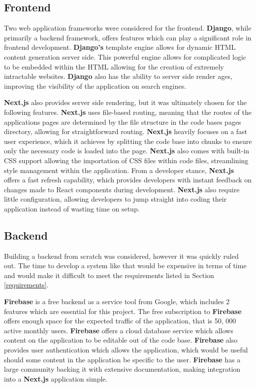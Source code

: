 \documentclass{l4proj}
\begin{document}
\subsection{Frontend}
Two web application frameworks were considered for the frontend. \textbf{Django},  while primarily a backend framework,  offers features which can play a significant role in frontend development. \textbf{Django's} template engine allows for dynamic HTML content generation server side. This powerful engine allows for complicated logic to be embedded within the HTML allowing for the creation of extremely intractable websites. \textbf{Django} also has the ability to server side render ages,  improving the visibility of the application on search engines.

\textbf{Next.js} also provides server side rendering,  but it was ultimately chosen for the following features. \textbf{Next.js} uses file-based routing,  meaning that the routes of the applications pages are determined by the file structure in the code bases pages directory,  allowing for straightforward routing. \textbf{Next.js} heavily focuses on a fast user experience,  which it achieves by splitting the code base into chunks to ensure only the necessary code is loaded into the page. \textbf{Next.js} also comes with built-in CSS support allowing the importation of CSS files within code files,  streamlining style management within the application. From a developer stance,  \textbf{Next.js} offers a fast refresh capability,  which provides developers with instant feedback on changes made to React components during development. \textbf{Next.js} also require little configuration,  allowing developers to jump straight into coding their application instead of wasting time on setup.

\subsection{Backend}
Building a backend from scratch was considered,  however it was quickly ruled out. The time to develop a system like that would be expensive in terms of time and would make it difficult to meet the requirements listed in Section \ref{requirements}.

\textbf{Firebase} is a free backend as a service tool from Google,  which includes 2 features which are essential for this project. The free subscription to \textbf{Firebase} offers enough space for the expected traffic of the application,  that is 50, 000 active monthly users. \textbf{Firebase} offers a cloud database service which allows content on the application to be editable out of the code base. \textbf{Firebase} also provides user authentication which allows the application,  which would be useful should some content in the application be specific to the user. \textbf{Firebase} has a large community backing it with extensive documentation,  making integration into a \textbf{Next.js} application simple.
\end{document}
